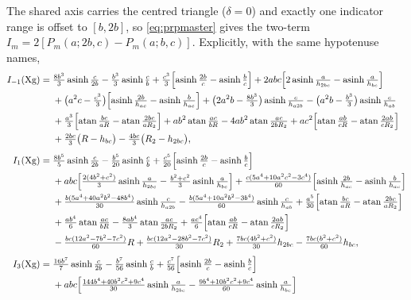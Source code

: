 \documentclass[11pt]{article}
\theoremstyle{remark}
\newcommand{\asinh}{\operatorname{asinh}}
\newcommand{\atan}{\operatorname{atan}}
\begin{document}
The shared axis carries the centred triangle ($\delta = 0$) and exactly one indicator
range is offset to $[b,2b]$, so \eqref{eq:prpmaster} gives the two-term
$I_m = 2[P_m(a;2b,c) - P_m(a;b,c)]$. Explicitly, with the same hypotenuse names,
{\small
\begin{align}
I_{-1}(\text{Xg}) ={}& \tfrac{8b^3}{3}\asinh\tfrac{c}{2b} - \tfrac{b^3}{3}\asinh\tfrac{c}{b}
 + \tfrac{c^3}{3}\Bigl[\asinh\tfrac{2b}{c} - \asinh\tfrac{b}{c}\Bigr]
 + 2abc\Bigl[2\asinh\tfrac{a}{h_{2bc}} - \asinh\tfrac{a}{h_{bc}}\Bigr]\notag\\
&+ \bigl(a^2c - \tfrac{c^3}{3}\bigr)\Bigl[\asinh\tfrac{2b}{h_{ac}} - \asinh\tfrac{b}{h_{ac}}\Bigr]
 + \bigl(2a^2b - \tfrac{8b^3}{3}\bigr)\asinh\tfrac{c}{h_{a2b}}
 - \bigl(a^2b - \tfrac{b^3}{3}\bigr)\asinh\tfrac{c}{h_{ab}}\notag\\
&+ \tfrac{a^3}{3}\Bigl[\atan\tfrac{bc}{aR} - \atan\tfrac{2bc}{aR_2}\Bigr]
 + ab^2\atan\tfrac{ac}{bR} - 4ab^2\atan\tfrac{ac}{2bR_2}
 + ac^2\Bigl[\atan\tfrac{ab}{cR} - \atan\tfrac{2ab}{cR_2}\Bigr]\notag\\
&+ \tfrac{2bc}{3}\bigl(R - h_{bc}\bigr) - \tfrac{4bc}{3}\bigl(R_2 - h_{2bc}\bigr),
\label{eq:xgm1}\\[4pt]
I_{1}(\text{Xg}) ={}& \tfrac{8b^5}{5}\asinh\tfrac{c}{2b} - \tfrac{b^5}{20}\asinh\tfrac{c}{b}
 + \tfrac{c^5}{20}\Bigl[\asinh\tfrac{2b}{c} - \asinh\tfrac{b}{c}\Bigr]\notag\\
&+ abc\Bigl[\tfrac{2(4b^2+c^2)}{3}\asinh\tfrac{a}{h_{2bc}} - \tfrac{b^2+c^2}{3}\asinh\tfrac{a}{h_{bc}}\Bigr]
 + \tfrac{c(5a^4+10a^2c^2-3c^4)}{60}\Bigl[\asinh\tfrac{2b}{h_{ac}} - \asinh\tfrac{b}{h_{ac}}\Bigr]\notag\\
&+ \tfrac{b(5a^4+40a^2b^2-48b^4)}{30}\asinh\tfrac{c}{h_{a2b}}
 - \tfrac{b(5a^4+10a^2b^2-3b^4)}{60}\asinh\tfrac{c}{h_{ab}}
 + \tfrac{a^5}{30}\Bigl[\atan\tfrac{bc}{aR} - \atan\tfrac{2bc}{aR_2}\Bigr]\notag\\
&+ \tfrac{ab^4}{6}\atan\tfrac{ac}{bR} - \tfrac{8ab^4}{3}\atan\tfrac{ac}{2bR_2}
 + \tfrac{ac^4}{6}\Bigl[\atan\tfrac{ab}{cR} - \atan\tfrac{2ab}{cR_2}\Bigr]\notag\\
&- \tfrac{bc(12a^2-7b^2-7c^2)}{60}R + \tfrac{bc(12a^2-28b^2-7c^2)}{30}R_2
 + \tfrac{7bc(4b^2+c^2)}{30}h_{2bc} - \tfrac{7bc(b^2+c^2)}{60}h_{bc},\\[4pt]
I_{3}(\text{Xg}) ={}& \tfrac{16b^7}{7}\asinh\tfrac{c}{2b} - \tfrac{b^7}{56}\asinh\tfrac{c}{b}
 + \tfrac{c^7}{56}\Bigl[\asinh\tfrac{2b}{c} - \asinh\tfrac{b}{c}\Bigr]\notag\\
&+ abc\Bigl[\tfrac{144b^4+40b^2c^2+9c^4}{30}\asinh\tfrac{a}{h_{2bc}} - \tfrac{9b^4+10b^2c^2+9c^4}{60}\asinh\tfrac{a}{h_{bc}}\Bigr]\notag\\

\end{align}}
\end{document}
